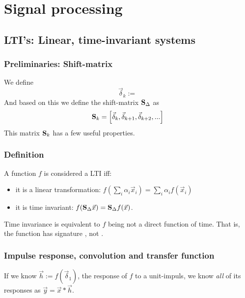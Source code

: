 \section{Signal processing}

\subsection{LTI's: Linear, time-invariant systems}

\subsubsection{Preliminaries: Shift-matrix}

We define 
$$ \vec{\delta}_k :=  $$
And based on this we define the shift-matrix $\mathbf{S}_\Delta$ as
$$ \mathbf{S}_k = \left[ \vec{\delta}_{k}, \vec{\delta}_{k+1}, \vec{\delta}_{k+2}, ... \right] $$
This matrix $\mathbf{S}_k$ has a few useful properties.

\subsubsection{Definition}

A function $f$ is considered a LTI iff: 

\begin{itemize}
    \item it is a linear transformation: $f(\sum_i \alpha_i \vec{x}_i) = \sum_i \alpha_i f(\vec{x}_i)$
    \item it is time invariant: $ f(\mathbf{S}_\Delta \vec{x}) = \mathbf{S}_\Delta f(\vec{x})$.
\end{itemize}

Time invariance is equivalent to $f$ being not a direct function of time. That is, the function has signature , not .

\subsubsection{Impulse response, convolution and transfer function}

If we know $\vec{h} := f(\vec{\delta}_1)$, the response of $f$ to a unit-impuls, we know \emph{all} of its responses as $\vec{y} = \vec{x} * \vec{h}$.


